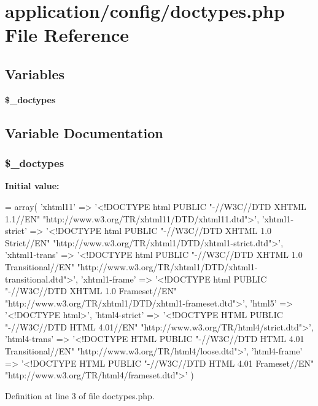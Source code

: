 \section{application/config/doctypes.php File Reference}
\label{doctypes_8php}
\subsection*{Variables}
\begin{DoxyCompactItemize}
\item 
{\bf \$\-\_\-doctypes}
\end{DoxyCompactItemize}


\subsection{Variable Documentation}
\subsubsection[{\$\-\_\-doctypes}]{\setlength{\rightskip}{0pt plus 5cm}\$\-\_\-doctypes}\label{doctypes_8php_aae4e5521057605d22a78c29c7d4ad7de}
{\bfseries Initial value\-:}
\begin{DoxyCode}
= array(
                    \textcolor{stringliteral}{'xhtml11'}       => \textcolor{stringliteral}{'<!DOCTYPE html PUBLIC "-//W3C//DTD XHTML 1.1//EN"
       "http://www.w3.org/TR/xhtml11/DTD/xhtml11.dtd">'},
                    \textcolor{stringliteral}{'xhtml1-strict'} => \textcolor{stringliteral}{'<!DOCTYPE html PUBLIC "-//W3C//DTD XHTML 1.0 Strict//EN"
       "http://www.w3.org/TR/xhtml1/DTD/xhtml1-strict.dtd">'},
                    \textcolor{stringliteral}{'xhtml1-trans'}  => \textcolor{stringliteral}{'<!DOCTYPE html PUBLIC "-//W3C//DTD XHTML 1.0 Transitional//EN"
       "http://www.w3.org/TR/xhtml1/DTD/xhtml1-transitional.dtd">'},
                    \textcolor{stringliteral}{'xhtml1-frame'}  => \textcolor{stringliteral}{'<!DOCTYPE html PUBLIC "-//W3C//DTD XHTML 1.0 Frameset//EN"
       "http://www.w3.org/TR/xhtml1/DTD/xhtml1-frameset.dtd">'},
                    \textcolor{stringliteral}{'html5'}         => \textcolor{stringliteral}{'<!DOCTYPE html>'},
                    \textcolor{stringliteral}{'html4-strict'}  => \textcolor{stringliteral}{'<!DOCTYPE HTML PUBLIC "-//W3C//DTD HTML 4.01//EN"
       "http://www.w3.org/TR/html4/strict.dtd">'},
                    \textcolor{stringliteral}{'html4-trans'}   => \textcolor{stringliteral}{'<!DOCTYPE HTML PUBLIC "-//W3C//DTD HTML 4.01 Transitional//EN"
       "http://www.w3.org/TR/html4/loose.dtd">'},
                    \textcolor{stringliteral}{'html4-frame'}   => \textcolor{stringliteral}{'<!DOCTYPE HTML PUBLIC "-//W3C//DTD HTML 4.01 Frameset//EN"
       "http://www.w3.org/TR/html4/frameset.dtd">'}
                    )
\end{DoxyCode}


Definition at line 3 of file doctypes.\-php.

